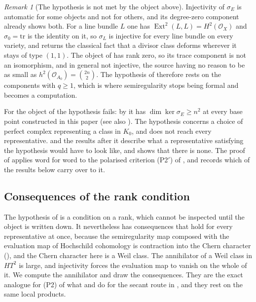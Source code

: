 \documentclass[11pt,reqno]{amsart}
\theoremstyle{plain}
\theoremstyle{definition}
\theoremstyle{remark}
\newtheorem{remark}[theorem]{Remark}
\newcommand{\cO}{\mathcal{O}}
\DeclareMathOperator{\Ext}{Ext}
\begin{document}
\begin{remark}[The hypothesis is not met by the object above]
\label{rem:semiregunavailable}
Injectivity of $\sigma_{E}$ is automatic for some objects and not for
others, and its degree-zero component already shows both. For a line bundle
$L$ one has $\Ext^{2}(L,L)=H^{2}(\cO_{X})$ and $\sigma_{0}=\mathrm{tr}$ is the
identity on it, so $\sigma_{L}$ is injective for every line bundle on every
variety, and  returns the classical fact that a divisor class
deforms wherever it stays of type $(1,1)$. The object of 
has rank zero, so its trace component is not an isomorphism, and in general
not injective, the source having no reason to be as small as
$h^{2}(\cO_{A_{0}})=\binom{2n}{2}$. The hypothesis of
 therefore rests on the components with $q\ge1$,
which is where semiregularity stops being formal and becomes a computation.

For the object of  the hypothesis fails: by
\cite[Proposition~9.10]{paperI} it has $\dim\ker\sigma_{E}\ge n^{2}$ at every base
point constructed in this paper (see also \cite[Remark~9.13]{paperI}). The
hypothesis concerns a choice of perfect complex representing a class in
$K_{0}$, and \cite[Proposition~9.10]{paperI} does not reach every representative.
 and the results after it describe what a representative
satisfying the hypothesis would have to look like, and 
shows that there is none. The proof of  applies word
for word to the polarised criterion \textup{(P2$'$)} of ,
and  records which of the results below carry over
to it.
\end{remark}

\subsection{Consequences of the rank condition}

The hypothesis of  is a condition on a rank, which
cannot be inspected until the object is written down. It nevertheless has
consequences that hold for every representative at once, because the
semiregularity map composed with the evaluation map of Hochschild cohomology
is contraction into the Chern character (), and the
Chern character here is a Weil class. The annihilator of a Weil class in
$HT^{2}$ is large, and injectivity forces the evaluation map to vanish on the
whole of it. We compute the annihilator and draw the consequences. They are
the exact analogue for (P2) of what  and
 do for the secant route in , and
they rest on the same local products.
\end{document}
